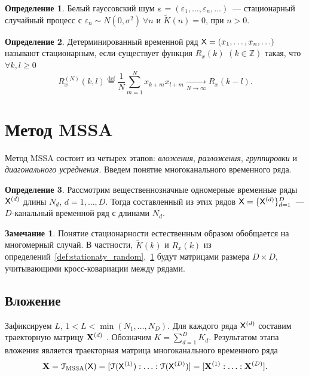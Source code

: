 \documentclass[specialist,
substylefile = spbu.rtx,
               subf,href,colorlinks=true,12pt]{disser}
\theoremstyle{definition}
\newtheorem{definition}{Определение}
\newtheorem{remark}{Замечание}
\begin{document}
\begin{definition}\label{def:stationaty_determ}
	Белый гауссовский шум $\boldsymbol{\varepsilon}=(\varepsilon_1,\ldots,\varepsilon_n,\ldots)$~--- стационарный случайный процесс с $\varepsilon_n\sim N(0, \sigma^2)~\forall n$ и $\widetilde K(n)=0$, при $n>0$.
\end{definition}
\begin{definition}
	Детерминированный временной ряд $\mathsf{X}=(x_1,\ldots,x_n,\ldots)$ называют стационарным, если существует функция $R_x(k)$ $(k\in\mathbb{Z})$ такая, что $\forall k,l\geqslant0$
	\begin{equation*}
		R_x^{(N)}(k,l)\overset{\text{def}}{=}\frac{1}{N}\sum_{m=1}^Nx_{k+m}x_{l+m}\underset{N\to\infty}\longrightarrow R_x(k - l).
	\end{equation*}
\end{definition}

\section{Метод MSSA}\label{sect:mssa}
Метод MSSA состоит из четырех этапов: \emph{вложения}, \emph{разложения}, \emph{группировки} и \emph{диагонального усреднения}. Введем понятие многоканального временного ряда.

\begin{definition}
	Рассмотрим вещественнозначные одномерные временные ряды $\mathsf{X}^{(d)}$ длины $N_d$, $d=1,\ldots,D$. Тогда составленный из этих рядов $\mathsf{X}=\{\mathsf{X}^{(d)}\}_{d=1}^D$~--- $D$-канальный временной ряд с длинами $N_d$.
\end{definition}
\begin{remark}
	Понятие стационарности естественным образом обобщается на многомерный случай. В частности, $\widetilde K(k)$ и $R_x(k)$ из определений~\ref{def:stationaty_random},~\ref{def:stationaty_determ} будут матрицами размера $D\times D$, учитывающими кросс-ковариации между рядами.
\end{remark}

\subsection{Вложение}\label{sect:embedding}
Зафиксируем $L$, $1<L<\min(N_1,\ldots,N_D)$. Для каждого ряда $\mathsf{X}^{(d)}$ составим траекторную матрицу $\mathbf{X}^{(d)}$ . Обозначим $K=\sum_{d=1}^D K_d$. Результатом этапа вложения является траекторная матрица многоканального временного ряда
\begin{equation}\label{eq:embedding_mssa}
	\mathbf{X}=\EuScript{T}_{\text{MSSA}}(\mathsf{X})=[\EuScript{T}(\mathsf{X}^{(1)}):\ldots:\EuScript{T}(\mathsf{X}^{(D)})]=[\mathbf{X}^{(1)}:\ldots:\mathbf{X}^{(D)}].
\end{equation}
\end{document}
